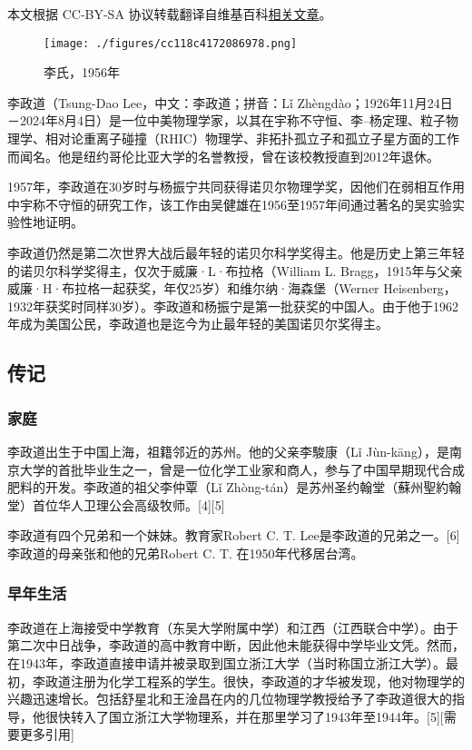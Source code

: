 
本文根据 CC-BY-SA 协议转载翻译自维基百科\href{https://en.wikipedia.org/wiki/Tsung-Dao_Lee}{相关文章}。

\begin{figure}[ht]
\centering
\texttt{[image: ./figures/cc118c4172086978.png]}
\caption{李氏，1956年} \label{fig_Tsung_1}
\end{figure}
李政道（Tsung-Dao Lee，中文：李政道；拼音：Lǐ Zhèngdào；1926年11月24日－2024年8月4日）是一位中美物理学家，以其在宇称不守恒、李–杨定理、粒子物理学、相对论重离子碰撞（RHIC）物理学、非拓扑孤立子和孤立子星方面的工作而闻名。他是纽约哥伦比亚大学的名誉教授，曾在该校教授直到2012年退休。

1957年，李政道在30岁时与杨振宁共同获得诺贝尔物理学奖，因他们在弱相互作用中宇称不守恒的研究工作，该工作由吴健雄在1956至1957年间通过著名的吴实验实验性地证明。

李政道仍然是第二次世界大战后最年轻的诺贝尔科学奖得主。他是历史上第三年轻的诺贝尔科学奖得主，仅次于威廉·L·布拉格（William L. Bragg，1915年与父亲威廉·H·布拉格一起获奖，年仅25岁）和维尔纳·海森堡（Werner Heisenberg，1932年获奖时同样30岁）。李政道和杨振宁是第一批获奖的中国人。由于他于1962年成为美国公民，李政道也是迄今为止最年轻的美国诺贝尔奖得主。
\subsection{传记}  
\subsubsection{家庭}  
李政道出生于中国上海，祖籍邻近的苏州。他的父亲李駿康（Lǐ Jùn-kāng），是南京大学的首批毕业生之一，曾是一位化学工业家和商人，参与了中国早期现代合成肥料的开发。李政道的祖父李仲覃（Lǐ Zhòng-tán）是苏州圣约翰堂（蘇州聖約翰堂）首位华人卫理公会高级牧师。[4][5]

李政道有四个兄弟和一个妹妹。教育家Robert C. T. Lee是李政道的兄弟之一。[6] 李政道的母亲张和他的兄弟Robert C. T. 在1950年代移居台湾。
\subsubsection{早年生活}  
李政道在上海接受中学教育（东吴大学附属中学）和江西（江西联合中学）。由于第二次中日战争，李政道的高中教育中断，因此他未能获得中学毕业文凭。然而，在1943年，李政道直接申请并被录取到国立浙江大学（当时称国立浙江大学）。最初，李政道注册为化学工程系的学生。很快，李政道的才华被发现，他对物理学的兴趣迅速增长。包括舒星北和王淦昌在内的几位物理学教授给予了李政道很大的指导，他很快转入了国立浙江大学物理系，并在那里学习了1943年至1944年。[5][需要更多引用]

